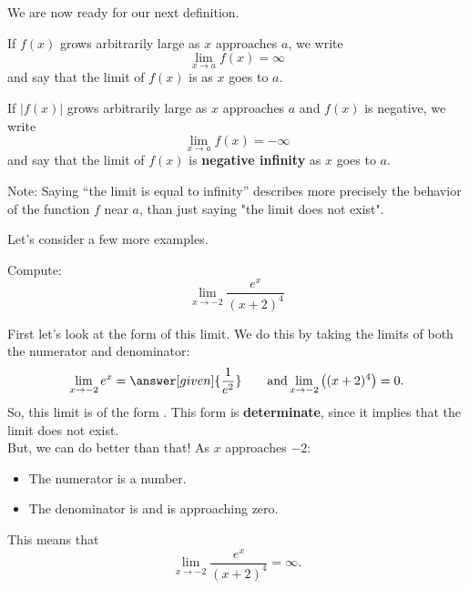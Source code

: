 \documentclass{ximera}
\begin{document}
We are now ready for our next definition.

\begin{definition}
If $f(x)$ grows arbitrarily large as $x$ approaches $a$, we write
\[
\lim_{x\to a} f(x) = \infty
\]
and say that the limit of $f(x)$ is   as $x$
goes to $a$.


If $|f(x)|$ grows arbitrarily large as $x$ approaches $a$ and $f(x)$ is
negative, we write
\[
\lim_{x\to a} f(x) = -\infty
\]
and say that the limit of $f(x)$ is  \textbf{ negative infinity}
as $x$ goes to $a$.

\end{definition}

Note: Saying ``the limit is equal to infinity''  describes more precisely the behavior of the function $f$ near $a$, than just saying "the limit does not exist".

Let's consider a few more examples.

\begin{example}
  Compute:
  \[
  \lim_{x\to -2} \frac{e^x}{(x+2)^4}
  \]
  \begin{explanation}
    First let's look at the form of this limit. We do this by taking the limits of both the numerator and denominator:
    \[
    \lim_{x\to -2} e^x = \answer[given]{\frac{1}{e^2}}\qquad\text{and}\lim_{x\to-2}\left((x+2)^4\right) = 0.
    \]
    So, this limit is of the form \numOverZero. This form is \textbf{determinate}, since it implies that  the limit does not exist.\\
    But, we can do better than that!
     As $x$ approaches $-2$:
    \begin{itemize}
    \item The numerator is a  number. 
    \item The denominator is  and is approaching zero.
    \end{itemize}
    This means that 
    \[
    \lim_{x\to -2} \frac{e^x}{(x+2)^4} = \infty.
    \]
  
  \end{explanation}
\end{example}
\end{document}
